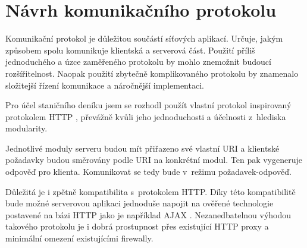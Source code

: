 \newpage
\section{Návrh komunikačního protokolu}
\label{navrh_protokol}


Komunikační protokol je důležitou součástí síťových aplikací. Určuje, jakým
způsobem spolu komunikuje
klientská a serverová část. Použití příliš jednoduchého a úzce zaměřeného
protokolu by mohlo znemožnit budoucí rozšířitelnost. Naopak použití zbytečně
komplikovaného protokolu by znamenalo složitejší řízení komunikace a náročnější
implementaci.

Pro účel staničního deníku jsem se rozhodl použít vlastní protokol inspirovaný protokolem HTTP \cite{http},
převážně kvůli jeho jednoduchosti a účelnosti z~hlediska modularity.

Jednotlivé moduly serveru budou mít přiřazeno své vlastní URI a klientské
požadavky budou směrovány podle URI na konkrétní modul.
Ten pak vygeneruje odpověď pro klienta. Komunikovat se tedy bude v~režimu požadavek-odpověď.

Důležitá je i zpětně kompatibilita s~protokolem HTTP. Díky této kompatibilitě
bude možné serverovou aplikaci jednoduše napojit na ověřené technologie postavené na bázi HTTP jako je například
AJAX \cite{ajax}. Nezanedbatelnou výhodou takového protokolu je i dobrá prostupnost přes
existující HTTP proxy a minimální omezení existujícími firewally.


